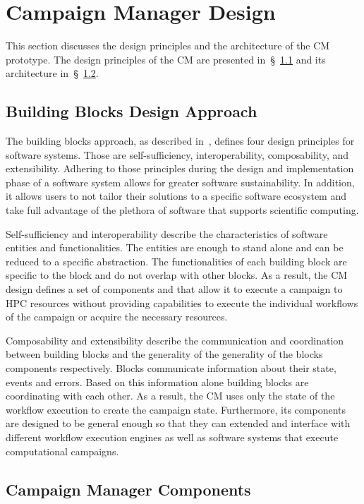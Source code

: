 \section{Campaign Manager Design}
\label{sec:cm_des}

This section discusses the design principles and the architecture of the 
CM prototype. The design principles of the CM are 
presented in~\S~\ref{ssec:building_blocks} and its architecture 
in~\S~\ref{ssec:cm_arch}.

\subsection{Building Blocks Design Approach}
\label{ssec:building_blocks}
The building blocks approach, as described in~\cite{turilli2019middleware}, 
defines four design principles for software systems. Those are 
self-sufficiency, interoperability, composability, and extensibility. Adhering 
to those principles during the design and implementation phase of a software 
system allows for greater software sustainability. In addition, it allows 
users to not tailor their solutions to a specific software ecosystem and take 
full advantage of the plethora of software that supports scientific computing.

Self-sufficiency and interoperability describe the characteristics of software 
entities and functionalities. The entities are enough to stand alone and can 
be reduced to a specific abstraction. The functionalities of each building 
block are specific to the block and do not overlap with other blocks. As a 
result, the CM design defines a set of components and that allow 
it to execute a campaign to HPC resources without providing capabilities to 
execute the individual workflows of the campaign or acquire the necessary 
resources.

Composability and extensibility describe the communication and coordination 
between building blocks and the generality of the generality of the blocks 
components respectively. Blocks communicate information about their state, 
events and errors. Based on this information alone building blocks are 
coordinating with each other. As a result, the CM uses only the 
state of the workflow execution to create the campaign state. Furthermore, its 
components are designed to be general enough so that they can extended and 
interface with different workflow execution engines as well as software 
systems that execute computational campaigns.

\subsection{Campaign Manager Components}
\label{ssec:cm_arch}

